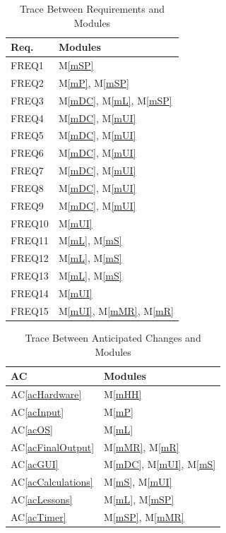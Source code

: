 \documentclass[12pt, titlepage]{article}
\newcommand{\acref}[1]{AC\ref{#1}}
\newcommand{\mref}[1]{M\ref{#1}}
\begin{document}
\begin{table}[H]
\centering
\begin{tabular}{p{} p{}}
\toprule
\textbf{Req.} & \textbf{Modules}\\
\midrule
FREQ1 & \mref{mSP}\\
FREQ2 & \mref{mP}, \mref{mSP}\\
FREQ3 & \mref{mDC}, \mref{mL}, \mref{mSP}\\
FREQ4 & \mref{mDC}, \mref{mUI}\\
FREQ5 & \mref{mDC}, \mref{mUI}\\
FREQ6 & \mref{mDC}, \mref{mUI}\\
FREQ7 & \mref{mDC}, \mref{mUI}\\
FREQ8 & \mref{mDC}, \mref{mUI}\\
FREQ9 & \mref{mDC}, \mref{mUI}\\
FREQ10 & \mref{mUI}\\
FREQ11 & \mref{mL}, \mref{mS}\\
FREQ12 & \mref{mL}, \mref{mS}\\
FREQ13 & \mref{mL}, \mref{mS}\\
FREQ14 & \mref{mUI}\\
FREQ15 & \mref{mUI}, \mref{mMR}, \mref{mR}\\
\bottomrule
\end{tabular}
\caption{Trace Between Requirements and Modules}
\label{TblRT}
\end{table}


\begin{table}[H]
\centering
\begin{tabular}{p{} p{}}
\toprule
\textbf{AC} & \textbf{Modules}\\
\midrule
\acref{acHardware} & \mref{mHH}\\
\acref{acInput} & \mref{mP}\\
\acref{acOS} & \mref{mL}\\
\acref{acFinalOutput} & \mref{mMR}, \mref{mR}\\
\acref{acGUI} & \mref{mDC}, \mref{mUI}, \mref{mS}\\
\acref{acCalculations} & \mref{mS}, \mref{mUI}\\
\acref{acLessons} & \mref{mL}, \mref{mSP} \\
\acref{acTimer} & \mref{mSP}, \mref{mMR}\\
\bottomrule
\end{tabular}
\caption{Trace Between Anticipated Changes and Modules}
\label{TblACT}
\end{table}
\end{document}
